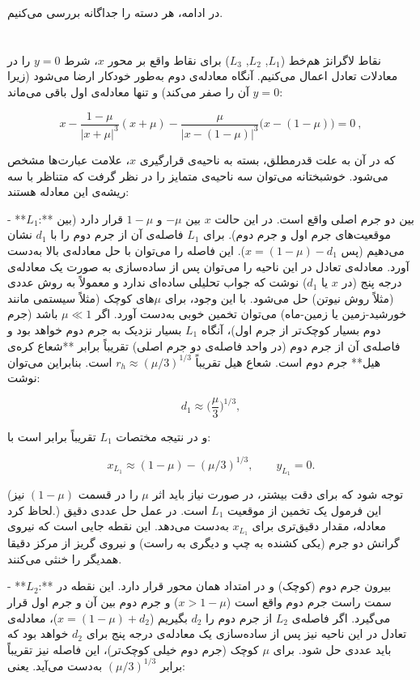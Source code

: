 در ادامه، هر دسته را جداگانه بررسی می‌کنیم.

\section{} نقاط لاگرانژ هم‌خط ($L_1$, $L_2$, $L_3$)  
برای نقاط واقع بر محور $x$، شرط $y=0$ را در معادلات تعادل اعمال می‌کنیم. آنگاه معادله‌ی دوم به‌طور خودکار ارضا می‌شود (زیرا $y=0$ آن را صفر می‌کند) و تنها معادله‌ی اول باقی می‌ماند:

$$ 
x - \dfrac{1-\mu}{|x+\mu|^3}(x+\mu) - \dfrac{\mu}{|x-(1-\mu)|^3}\Big(x-(1-\mu)\Big) = 0~,
$$

که در آن به علت قدرمطلق، بسته به ناحیه‌ی قرارگیری $x$، علامت عبارت‌ها مشخص می‌شود. خوشبختانه می‌توان سه ناحیه‌ی متمایز را در نظر گرفت که متناظر با سه ریشه‌ی این معادله هستند:  

- **$L_1$:** بین دو جرم اصلی واقع است. در این حالت $x$ بین $-\mu$ و $1-\mu$ قرار دارد (بین موقعیت‌های جرم اول و جرم دوم). برای $L_1$ فاصله‌ی آن از جرم دوم را با $d_1$ نشان می‌دهیم (پس $x = (1-\mu) - d_1$). این فاصله را می‌توان با حل معادله‌ی بالا به‌دست آورد. معادله‌ی تعادل در این ناحیه را می‌توان پس از ساده‌سازی به صورت یک معادله‌ی درجه پنج (در $x$ یا $d_1$) نوشت که جواب تحلیلی ساده‌ای ندارد و معمولاً به روش عددی (مثلاً روش نیوتن) حل می‌شود. با این وجود، برای $\mu$های کوچک (مثلاً سیستمی مانند خورشید-زمین یا زمین-ماه) می‌توان تخمین خوبی به‌دست آورد. اگر $\mu \ll 1$ باشد (جرم دوم بسیار کوچک‌تر از جرم اول)، آنگاه $L_1$ بسیار نزدیک به جرم دوم خواهد بود و فاصله‌ی آن از جرم دوم (در واحد فاصله‌ی دو جرم اصلی) تقریباً برابر **شعاع کره‌ی هیل** جرم دوم است. شعاع هیل تقریباً $r_h \approx (\mu/3)^{1/3}$ است. بنابراین می‌توان نوشت: 

$$d_1 \approx \Big(\dfrac{\mu}{3}\Big)^{1/3},$$ 

و در نتیجه مختصات $L_1$ تقریباً برابر است با: 

$$x_{L_1} \approx (1-\mu) - (\mu/3)^{1/3}, \qquad y_{L_1}=0.$$ 

(توجه شود که برای دقت بیشتر، در صورت نیاز باید اثر $\mu$ را در قسمت $(1-\mu)$ نیز لحاظ کرد.) این فرمول یک تخمین از موقعیت $L_1$ است. در عمل حل عددی دقیق معادله، مقدار دقیق‌تری برای $x_{L_1}$ به‌دست می‌دهد. این نقطه جایی است که نیروی گرانش دو جرم (یکی کشنده به چپ و دیگری به راست) و نیروی گریز از مرکز دقیقا همدیگر را خنثی می‌کنند. 

- **$L_2$:** بیرون جرم دوم (کوچک) و در امتداد همان محور قرار دارد. این نقطه در سمت راست جرم دوم واقع است ($x > 1-\mu$) و جرم دوم بین آن و جرم اول قرار می‌گیرد. اگر فاصله‌ی $L_2$ از جرم دوم را $d_2$ بگیریم ($x = (1-\mu) + d_2$)، معادله‌ی تعادل در این ناحیه نیز پس از ساده‌سازی یک معادله‌ی درجه پنج برای $d_2$ خواهد بود که باید عددی حل شود. برای $\mu$ کوچک (جرم دوم خیلی کوچک‌تر)، این فاصله نیز تقریباً برابر $(\mu/3)^{1/3}$ به‌دست می‌آید. یعنی: 

